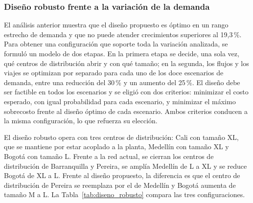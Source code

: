 \documentclass[fleqn, 11pt,letterpaper]{article}
\begin{document}
\subsubsection*{Diseño robusto frente a la variación de la demanda}
El análisis anterior muestra que el diseño propuesto es óptimo en un rango estrecho de demanda y que no puede atender crecimientos superiores al 19,3\,\%. Para obtener una configuración que soporte toda la variación analizada, se formuló un modelo de dos etapas. En la primera etapa se decide, una sola vez, qué centros de distribución abrir y con qué tamaño; en la segunda, los flujos y los viajes se optimizan por separado para cada uno de los doce escenarios de demanda, entre una reducción del 30\,\% y un aumento del 25\,\%. El diseño debe ser factible en todos los escenarios y se eligió con dos criterios: minimizar el costo esperado, con igual probabilidad para cada escenario, y minimizar el máximo sobrecosto frente al diseño óptimo de cada escenario. Ambos criterios conducen a la misma configuración, lo que refuerza su elección.

El diseño robusto opera con tres centros de distribución: Cali con tamaño XL, que se mantiene por estar acoplado a la planta, Medellín con tamaño XL y Bogotá con tamaño L. Frente a la red actual, se cierran los centros de distribución de Barranquilla y Pereira, se amplía Medellín de L a XL y se reduce Bogotá de XL a L. Frente al diseño propuesto, la diferencia es que el centro de distribución de Pereira se reemplaza por el de Medellín y Bogotá aumenta de tamaño M a L. La Tabla~\ref{tab:diseno_robusto} compara las tres configuraciones.
\end{document}

